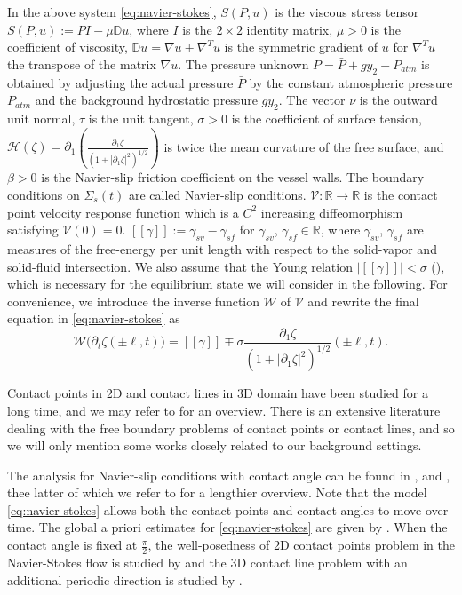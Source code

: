 \documentclass[letterpaper,reqno,10pt,twoside]{amsart}
\theoremstyle{definition}
\theoremstyle{remark}
\def\p{\partial}
\begin{document}
	In the above system \eqref{eq:navier-stokes}, $S(P,u)$ is the viscous stress tensor
	$S(P,u):=PI-\mu\mathbb{D}u$,
	where $I$ is the $2\times2$ identity matrix, $\mu>0$ is the coefficient of viscosity, $\mathbb{D}u=\nabla u+\nabla^T u$ is the symmetric gradient of $u$ for $\nabla^T u$ the transpose of the matrix $\nabla u$.  The pressure unknown $P=\bar{P}+gy_2-P_{atm}$ is obtained by adjusting the actual pressure $\bar{P}$ by the constant atmospheric pressure $P_{atm}$ and the background hydrostatic pressure $gy_2$.  The vector $\nu$ is the outward unit normal, $\tau$ is the unit tangent, $\sigma>0$ is the coefficient of surface tension,
	$
	\mathcal{H}(\zeta)=\p_1\left(\tfrac{\p_1\zeta}{(1+|\p_1\zeta|^2)^{1/2}}\right)
	$
	is twice the mean curvature of the free surface, and $\beta>0$ is the Navier-slip friction coefficient on the vessel walls. The boundary conditions on $\Sigma_s(t)$ are called Navier-slip conditions. $\mathscr{V}:\mathbb{R}\rightarrow\mathbb{R}$ is the contact point velocity response function which is a $C^2$ increasing diffeomorphism satisfying $\mathscr{V}(0)=0$. $[\![\gamma]\!]:=\gamma_{sv}-\gamma_{sf}$ for $\gamma_{sv}$, $\gamma_{sf}\in\mathbb{R}$, where $\gamma_{sv}$, $\gamma_{sf}$ are measures of the free-energy per unit length with respect to the solid-vapor and solid-fluid intersection. We also assume that the Young relation
	$|[\![\gamma]\!]|<\sigma$ (\cite{Yo}),
	which is necessary for the equilibrium state we will consider in the following. For convenience, we introduce the inverse function $\mathscr{W}$ of $\mathscr{V}$ and rewrite the final equation in \eqref{eq:navier-stokes} as
	\begin{equation}\label{eq:contact law}
		\mathscr{W}\big(\p_t\zeta(\pm\ell,t)\big)=[\![\gamma]\!]\mp\sigma\frac{\p_1\zeta}{(1+|\p_1\zeta|^2)^{1/2}}(\pm\ell,t).
	\end{equation}
	
	Contact points in 2D and contact lines in 3D domain have been studied for a long time, and we may refer to \cite[de Gennes]{dG} for an overview. There is an extensive literature dealing with the free boundary problems of contact points or contact lines, and so we will only mention some works closely related to our background settings.
	
	The analysis for Navier-slip conditions with contact angle can be found in \cite[Ren-E]{RE}, \cite[Cox]{C1986} and \cite[Guo-Tice]{GT2020}, thee latter of which we refer to for a lengthier  overview.  Note that the model \eqref{eq:navier-stokes} allows both the contact points and contact angles to move over time.
	The global a priori estimates for \eqref{eq:navier-stokes} are given by \cite[Guo-Tice]{GT2020}. When the contact angle is fixed at $\frac\pi2$, the well-posedness of 2D contact points problem in the Navier-Stokes flow is studied by \cite[Schweizer]{S01} and the 3D contact line problem with an additional periodic direction is studied by \cite[Bodea]{Bo06}.
	
\end{document}
